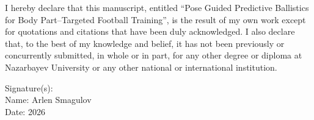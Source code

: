 
I hereby declare that this manuscript, entitled ``Pose Guided Predictive Ballistics for Body Part--Targeted Football Training'', is the result of my own work except for quotations and citations that have been duly acknowledged. I also declare that, to the best of my knowledge and belief, it has not been previously or concurrently submitted, in whole or in part, for any other degree or diploma at Nazarbayev University or any other national or international institution.

\vspace{1cm}

Signature(s): \underline{\hspace{5cm}} \\[0.5cm]
Name: Arlen Smagulov \\[0.5cm]
Date: 2026
